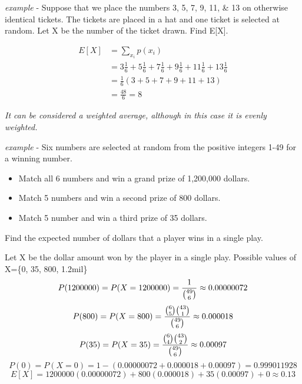 \documentclass{letter}
\newenvironment{itemizeminus}{\begin{itemize} \renewcommand{\labelitemi}{$-$}\renewcommand{\labelitemii}{$-$}\renewcommand{\labelitemiii}{$-$}\renewcommand{\labelitemiv}{$-$}}{\end{itemize}}
\begin{document}
\emph{example} - Suppose that we place the numbers 3, 5, 7, 9, 11, \& 13 on otherwise
identical tickets. The tickets are placed in a hat and one ticket is selected
at random. Let X be the number of the ticket drawn. Find E[X].

\begin{align*}
E [X] & = \sum_{x_i} p (x_i)\\
& = 3\frac{1}{6}+5\frac{1}{6}+7\frac{1}{6}+9\frac{1}{6}+11\frac{1}{6}+13\frac{1}{6}\\
& = \frac{1}{6}(3+5+7+9+11+13)\\
& = \frac{48}{6}=8
\end{align*}

\emph{It can be considered a weighted average, although in this case it is evenly
weighted.}
\pagebreak

\emph{example} - Six numbers are selected at random from the positive integers 1-49
for a winning number.
\begin{itemizeminus}
  \item Match all 6 numbers and win a grand prize of 1,200,000 dollars.
  \item Match 5 numbers and win a second prize of 800 dollars.
  \item Match 5 number and win a third prize of 35 dollars.
\end{itemizeminus}
Find the expected number of dollars that a player wins in a single play.

Let X be the dollar amount won by the player in a single play.
Possible values of X=\{0, 35, 800, 1.2mil\}
\begin{equation*}
P (1200000) = P(X = 1200000) \\
= \frac{1}{\binom{49}{6}} \approx 0.00000072
\end{equation*}
\begin{equation*}
P (800) = P(X = 800) \\
= \frac{\binom{6}{5} \binom{43}{1}}{\binom{49}{6}} \approx 0.000018
\end{equation*}
\begin{equation*}
P (35) = P (X = 35) \\
= \frac{\binom{6}{4} \binom{43}{2}}{\binom{49}{6}} \approx 0.00097
\end{equation*}
\begin{equation*}
P(0) = P(X=0)
= 1-(0.00000072 +0.000018+0.00097)
= 0.999011928
\end{equation*}
\begin{equation*}
E[X] = 1200000(0.00000072)+800(0.000018)+35(0.00097)+0 \approx 0.13
\end{equation*}
\end{document}

